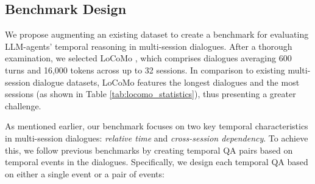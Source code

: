 \begin{table}[ht]
\small
\centering
{}
\caption{Dataset statistics and details of the constructed benchmark.\textit{$\#$ of Options} refers to the number of options for each temporal question. \textit{$\#$ of Events} refers to the number of selected events to create each temporal question. \textit{Event Type} specifies the type of temporal events chosen for question creation, where \textit{(+ relative time)} indicates that relative time was an additional consideration in event selection.  Note that our benchmark not only contains more temporal QAs than LoCoMo, but also include unanswerable questions.}
\label{tab:statistics}
\end{table}

\subsection{Benchmark Design}
We propose augmenting an existing dataset to create a benchmark for evaluating LLM-agents' temporal reasoning in multi-session dialogues. After a thorough examination, we selected LoCoMo \cite{maharana-etal-2024-evaluating}, which comprises dialogues averaging 600 turns and 16,000 tokens across up to 32 sessions. In comparison to existing multi-session dialogue datasets, LoCoMo features the longest dialogues and the most sessions (as shown in Table \ref{tab:locomo_statistics}), thus presenting a greater challenge.

As mentioned earlier, our benchmark focuses on two key temporal characteristics in multi-session dialogues: \textit{relative time} and \textit{cross-session dependency}. To achieve this, we follow previous benchmarks \cite{chen2dataset,xiong-etal-2024-large,wang-zhao-2024-tram} by creating temporal QA pairs based on temporal events in the dialogues. Specifically, we design each temporal QA based on either a single event or a pair of events:


